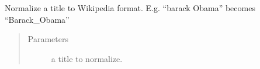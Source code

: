 \documentclass[letterpaper,10pt,english]{sphinxmanual}
\begin{document}
\begin{fulllineitems}
\label{\detokenize{code_comment/tweet_processor:hate_tweet_map.tweets_processor.MyTagMe.normalize_title}}
\sphinxAtStartPar
Normalize a title to Wikipedia format. E.g. “barack Obama” becomes “Barack\_Obama”
\begin{quote}\begin{description}
\item[{Parameters}] \leavevmode
\sphinxAtStartPar
{} \textendash{} a title to normalize.

\end{description}\end{quote}

\end{fulllineitems}

\end{document}

